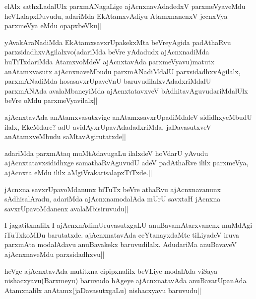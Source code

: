 \begin{artha}
elAlx sathxLadalUlx parxmANagaLige ajAcnxnavAdadedxV parxmeVyaveMdu heVLalapxDuvudu, adariMda EkAtamxvAdiyu AtamxnanenxV jecnxVya parxmeVya eMdu opapxbeVku||
\end{artha}

\begin{artha}
yAvakAraNadiMda EkAtamxsavxrUpakekxMta beVreyAgida padAthaRvu parxsidadhxvAgilalxvo(adariMda beVre yAdadudx ajAcnxnadiMda huTiTxdariMda AtamxvoMdeV ajAcnxtavAda parxmeVyavu)matutx anAtamxvasutx ajAcnxnaveMbudu parxmANadiMdalU parxsidadhxvAgilalx, parxmANadiMda hosasavxrUpaveVnU baruvudilalxvAdadxriMdalU parxmANAda avalaMbaneyiMda ajAcnxtatavxveV bAdhitavAguvudariMdalUlx beVre oMdu parxmeVyavilalx||
\end{artha}

\begin{artha}
ajAcnxtavAda anAtamxvasutxvige anAtamxsavxrUpadiMdaleV sididhxyeMbudU ilalx, EkeMdare? adU avidAyxrUpavAdadadxriMda, jaDavasutxveV anAtamxveMbudu saMtavAgirutatxde||
\end{artha}

\begin{artha}
adariMda parxmAtaq muMtAdavugaLu ilalxdeV hoVdarU yAvudu ajAcnxtatavxsididhxge samathaRvAguvudU adeV padAthaRve ililx parxmeVya, ajAcnxta eMdu ililx aMgiVrakarisalapxTiTxde.||
\end{artha}


\begin{artha}
jAcnxna savxrUpavoMdanunx biTuTx beVre athaRvu ajAcnxnavanunx sAdhisalAradu, adariMda ajAcnxnamodalAda mUrU savxtaH jAcnxna savxrUpavoMdanenx avalaMbisiruvudu||
\end{artha}

\begin{artha}
I jagatitxnalilx I ajAcnxnAdimUruvasutxgaLU anuBavamAtarxvanenx muMdAgi iTuTxkoMDu barutatxde. ajAcnxnatavAda ceYtanayxdaMte tiLiyadeV iruva parxmAta modalAdavu anuBavakekx baruvudilalx. AdudariMa anuBavaveV ajAcnxnaveMdu parxsidadhxvu||
\end{artha}


\begin{artha}
heVge ajAcnxtavAda mutitxna cipipxnalilx beVLiye modalAda viSaya nishacxyavu(Barxmeyu) baruvudo hAgeye ajAcnxnatavAda anuBavarUpanAda Atamxnalilx anAtamx(jaDavasutxgaLu) nishacxyavu baruvudu||
\end{artha}

